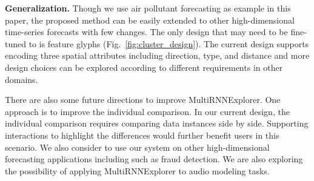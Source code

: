 \textbf{Generalization.}
Though we use air pollutant forecasting as example in this paper, the proposed method can be easily extended to other high-dimensional time-series forecasts with few changes. 
The only design that may need to be fine-tuned to is feature glyphs (Fig.~\ref{fig:cluster_design}).
The current design supports encoding three spatial attributes including direction, type, and distance and more design choices can be explored according to different requirements in other domains. 


There are also some future directions to improve MultiRNNExplorer.
One approach is to improve the individual comparison. 
In our current design, the individual comparison requires comparing data instances side by side. 
Supporting interactions to highlight the differences would further benefit users in this scenario.
We also consider to use our system on other high-dimensional forecasting applications including such as fraud detection\cite{jurgovsky2018sequence}. 
We are also exploring the possibility of applying MultiRNNExplorer to audio modeling tasks. 


